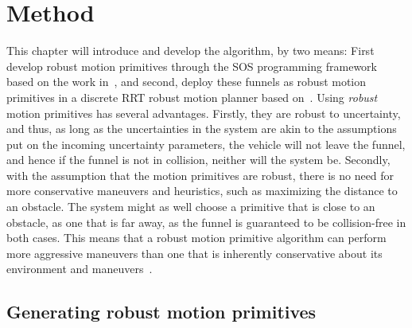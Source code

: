 \chapter{Method}

This chapter will introduce and develop the \rrtfunnel{} algorithm, by two
means: First develop robust motion primitives through the \ac{SOS} programming
framework based on the work in~\cite{majumdarFunnelLibrariesRealtime2017}, and
second, deploy these funnels as robust motion primitives in a discrete \ac{RRT}
robust motion planner based on~\cite{lavalleLav98cPdf}. Using \textit{robust}
motion primitives has several advantages. Firstly, they are robust to
uncertainty, and thus, as long as the uncertainties in the system are akin to
the assumptions put on the incoming uncertainty parameters, the vehicle will not
leave the funnel, and hence if the funnel is not in collision, neither will the
system be. Secondly, with the assumption that the motion primitives are robust,
there is no need for more conservative maneuvers and heuristics, such as
maximizing the distance to an obstacle. The system might as well choose a
primitive that is close to an obstacle, as one that is far away, as the funnel
is guaranteed to be collision-free in both cases. This means that a robust
motion primitive algorithm can perform more aggressive maneuvers than one that
is inherently conservative about its environment and
maneuvers~\cite{singhRobustOnlineMotion2017}.

\section{Generating robust motion primitives}

